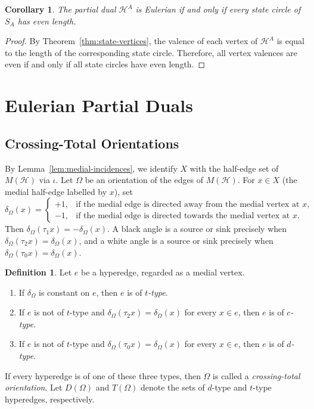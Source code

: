 \documentclass{article}
\newtheorem{corollary}[theorem]{Corollary}
\theoremstyle{definition}
\newtheorem{definition}[theorem]{Definition}
\theoremstyle{remark}
\newcommand{\Hcal}{\mathcal{H}}
\begin{document}
\begin{corollary}\label{cor:even-state}
The partial dual $\Hcal^A$ is Eulerian if and only if every state circle of
$S_A$ has even length.
\end{corollary}

\begin{proof}
By Theorem~\ref{thm:state-vertices}, the valence of each vertex of
$\Hcal^A$ is equal to the length of the corresponding state circle.
Therefore, all vertex valences are even if and only if all state circles have
even length.
\end{proof}

\section{Eulerian Partial Duals}

\subsection{Crossing-Total Orientations}

By Lemma~\ref{lem:medial-incidences}, we identify $X$ with the half-edge set of $M(\Hcal)$ via $\iota$. Let $\Omega$ be an orientation of the edges of $M(\Hcal)$. For $x\in X$ (the medial half-edge labelled by $x$), set
\[
 \delta_\Omega(x)=
 \begin{cases}
  +1,&\text{if the medial edge is directed away from the medial vertex at }x,\\
  -1,&\text{if the medial edge is directed towards the medial vertex at }x.
 \end{cases}
\]
Then $\delta_\Omega(\tau_1x)=-\delta_\Omega(x)$. A black angle is a source or sink precisely when $\delta_\Omega(\tau_2x)=\delta_\Omega(x)$, and a white angle is a source or sink precisely when $\delta_\Omega(\tau_0x)=\delta_\Omega(x)$.

\begin{definition}\label{def:crossing-total}
Let $e$ be a hyperedge, regarded as a medial vertex.
\begin{enumerate}[label=\textup{(\alph*)}]
\item If $\delta_\Omega$ is constant on $e$, then $e$ is of \emph{$t$-type}.
\item If $e$ is not of $t$-type and $\delta_\Omega(\tau_2x)=\delta_\Omega(x)$ for every $x\in e$, then $e$ is of \emph{$c$-type}.
\item If $e$ is not of $t$-type and $\delta_\Omega(\tau_0x)=\delta_\Omega(x)$ for every $x\in e$, then $e$ is of \emph{$d$-type}.
\end{enumerate}
If every hyperedge is of one of these three types, then $\Omega$ is called a \emph{crossing-total orientation}. Let $D(\Omega)$ and $T(\Omega)$ denote the sets of $d$-type and $t$-type hyperedges, respectively.
\end{definition}
\end{document}
